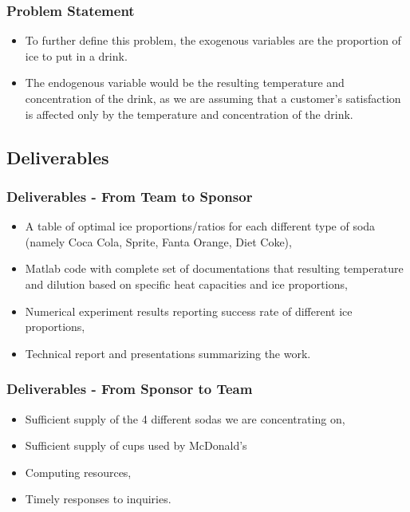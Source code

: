 \documentclass[compress,handout,10pt]{beamer}
\let\olditem\item
\renewcommand{\item}{\setlength{\itemsep}{0.5\baselineskip}\olditem}
\begin{document}
\begin{frame}
    \frametitle{Problem Statement}
     \begin{itemize}
      \item To further define this problem, the exogenous variables are the proportion of ice to put in a drink. 
\item The endogenous variable would be the resulting temperature and concentration of the drink, as we are assuming that a customer's satisfaction is affected only by the temperature and concentration of the drink.
     \end{itemize}
\end{frame}

\subsection{Deliverables}
\begin{frame}
    \frametitle{Deliverables - From Team to Sponsor}


\begin{itemize}
    \item A table of optimal ice proportions/ratios for each different type of soda (namely Coca Cola, Sprite, Fanta Orange, Diet Coke),
    \item Matlab code with complete set of documentations that resulting temperature and dilution based on specific heat capacities and ice proportions,
    \item Numerical experiment results reporting success rate of different ice proportions,
    \item Technical report and presentations summarizing the work. 
\end{itemize}


\end{frame}

\begin{frame}
    \frametitle{Deliverables - From Sponsor to Team}

\begin{itemize}
    \item Sufficient supply of the 4 different sodas we are concentrating on,
\item Sufficient supply of cups used by McDonald's
    \item Computing resources,
    \item Timely responses to inquiries.
\end{itemize}
\end{frame}
\end{document}
